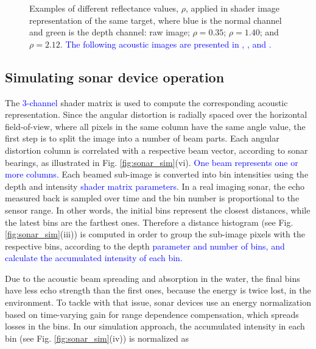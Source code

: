\documentclass[final,5p,times]{elsarticle}
\begin{document}
\begin{figure}[!ht]
{        \label{fig:reflectance:view:2_12}
    }
    \captionsetup{justification=justified}
    \caption{Examples of different reflectance values, $\rho$, applied in
    shader image representation of the same target, where blue is the normal channel and
    green is the depth channel:  raw image;
     $\rho = 0.35$;
     $\rho = 1.40$; and
     $\rho = 2.12$. \textcolor{blue}{The following
    acoustic images are presented in ,
    , 
    and .}}
    \label{fig:sonar_reflectances}
\end{figure}



\subsection{Simulating sonar device operation}
\label{dev:sonardata}

The \textcolor{blue}{3-channel} shader matrix is used to compute the corresponding
acoustic representation. Since the angular distortion is radially spaced
over the horizontal field-of-view, where all pixels in the same column
have the same angle value, the first step is to split the image into a
number of beam parts. Each angular distortion column is correlated with a respective beam vector,
according to sonar bearings, as illustrated in Fig. \ref{fig:sonar_sim}(vi).
\textcolor{blue}{One beam represents one or more columns.} Each
beamed sub-image is converted into bin intensities using the depth and
intensity \textcolor{blue}{shader matrix parameters}. In a real imaging sonar, the echo
measured back is sampled
over time and the bin number is proportional to the sensor range. In other
words, the initial bins represent the closest distances, while the latest
bins are the farthest ones. Therefore a distance histogram (see Fig. \ref{fig:sonar_sim}(iii)) is computed in order to
group the sub-image pixels with the respective bins, according to the
depth \textcolor{blue}{parameter and number of bins,
and calculate the accumulated intensity of each bin.}

Due to the acoustic beam spreading and absorption in the water, the final
bins have less echo strength than the first ones, because the energy is
twice lost, in the environment. To tackle with that issue, sonar devices
use an energy normalization based on time-varying gain for range dependence
compensation, which spreads losses in the bins. In our simulation approach,
the accumulated intensity in each bin (see Fig. \ref{fig:sonar_sim}(iv)) is normalized as
\end{document}
